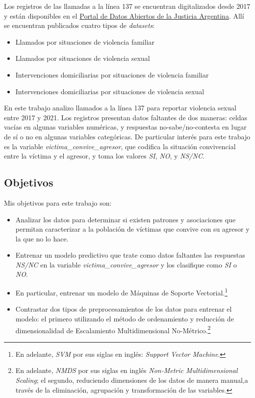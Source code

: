 \documentclass[10 pt]{article}
\begin{document}
Los registros de las llamadas a la línea 137 se encuentran digitalizados desde 2017 y están disponibles en el \href{http://datos.jus.gob.ar/}{Portal de Datos Abiertos de la Justicia Argentina}. Allí se encuentran publicados cuatro tipos de \textit{datasets}: 

\begin{itemize}
    \item Llamados por situaciones de violencia familiar
    \item Llamados por situaciones de violencia sexual
    \item Intervenciones domiciliarias por situaciones de violencia familiar
    \item Intervenciones domiciliarias por situaciones de violencia sexual
\end{itemize}

En este trabajo analizo llamados a la línea 137 para reportar violencia sexual entre 2017 y 2021. Los registros  presentan datos faltantes de dos maneras: celdas vacías en algunas variables numéricas, y respuestas no-sabe/no-contesta en lugar de sí o no en algunas variables categóricas. De particular interés para este trabajo es la variable \textit{victima\_convive\_agresor}, que codifica la situación convivencial entre la víctima y el agresor, y toma los valores \textit{SI}, \textit{NO}, y \textit{NS/NC}.

\subsection{Objetivos}

Mis objetivos para este trabajo son:

\begin{itemize}
    \item Analizar los datos para determinar si existen patrones y asociaciones que permitan caracterizar a la población de víctimas que convive con su agresor y la que no lo hace.
    \item Entrenar un modelo predictivo que trate como datos faltantes las respuestas \textit{NS/NC} en la variable \textit{victima\_convive\_agresor} y los clasifique como \textit{SI} o \textit{NO}. 
    \item En particular, entrenar un modelo de Máquinas de Soporte Vectorial.\footnote{En adelante, \textit{SVM} por sus siglas en inglés: \textit{Support Vector Machine}.}  
    \item Contrastar dos tipos de preprocesamientos de los datos para entrenar el modelo: el primero utilizando el método de ordenamiento y reducción de dimensionalidad de Escalamiento Multidimensional No-Métrico.\footnote{En adelante, \textit{NMDS} por sus siglas en inglés \textit{Non-Metric Multidimensional Scaling}; el segundo, reduciendo dimensiones de los datos de manera manual,a través de la eliminación, agrupación y transformación de las variables.} 

\end{itemize}
\end{document}
